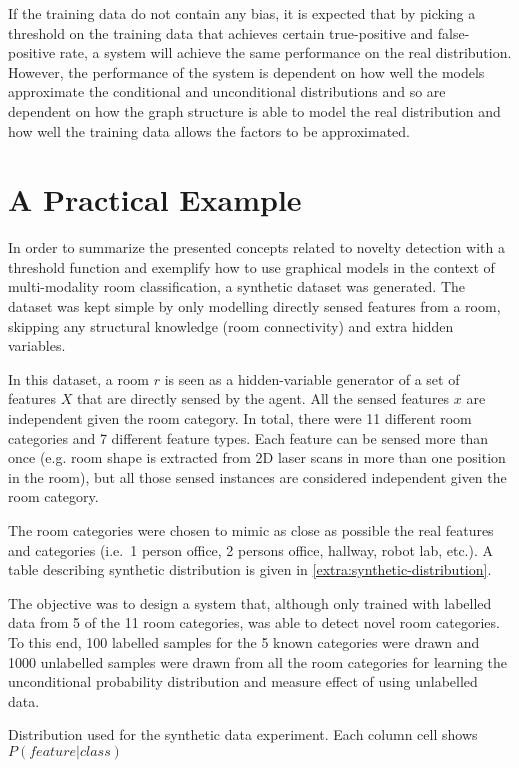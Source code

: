 If the training data do not contain any bias, it is expected that by picking a threshold on the training 
data that achieves certain true-positive and false-positive rate, a system will achieve the same performance 
on the real distribution. However, the performance of the system is dependent on how well the models 
approximate the conditional and unconditional distributions and so are dependent on how the graph structure 
is able to model the real distribution and how well the training data allows the factors to be approximated.

\section{A Practical Example}
\label{sec:unlabelled-data}
In order to summarize the presented concepts related to novelty detection with a threshold
function and exemplify how to use graphical models in the context of
multi-modality room classification, a synthetic dataset was generated.
The dataset was kept simple by only modelling directly sensed features from a
room, skipping any structural knowledge (room connectivity) and extra hidden variables.

In this dataset, a room $r$ is seen as a hidden-variable generator of a set of
features $X$ that are directly sensed by the agent.
All the sensed features $x$ are independent given the room category.
In total, there were 11 different room categories and 7 different feature types.
Each feature can be sensed more than once (e.g. room shape is extracted from 2D
laser scans in more than one position in the room), but all those sensed
instances are considered independent given the room category.

The room categories were chosen to mimic as close as possible the real features
and categories (i.e.\ 1 person office, 2 persons office,
hallway, robot lab, etc.). A table describing synthetic
distribution is given in \autoref{extra:synthetic-distribution}.

The objective was to design a system that, although only trained with
labelled data from 5 of the 11 room categories, was able to detect novel
room categories. To this end, 100 labelled samples for the 5 known categories 
were drawn and 1000 unlabelled samples were drawn from all the room categories for 
learning the unconditional probability distribution and measure effect of using 
unlabelled data.

\begin{sidewaystable}[h]
\begin{center}
\scalebox{0.40}{}
\end{center}
\caption{\label{extra:synthetic-distribution}Distribution used for the synthetic data experiment. Each column cell shows $P(feature|class)$}
\end{sidewaystable}


